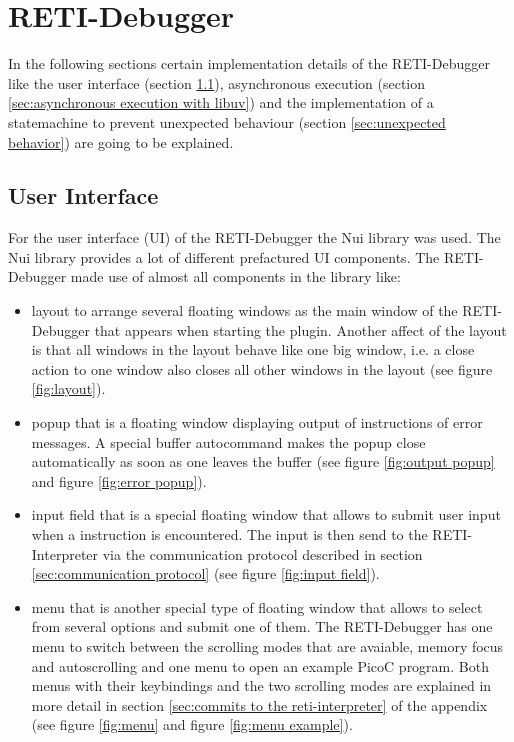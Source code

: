 \documentclass{report}
\begin{document}
\chapter{RETI-Debugger}
\label{ch:reti-debugger}

In the following sections certain implementation details of the RETI-Debugger like the user interface (section \ref{sec:user interface with nui}), asynchronous execution (section \ref{sec:asynchronous execution with libuv}) and the implementation of a statemachine to prevent unexpected behaviour (section \ref{sec:unexpected behavior}) are going to be explained.



\section{User Interface}
\label{sec:user interface with nui}

For the user interface (\alert{UI}) of the RETI-Debugger the \alert{Nui library}\cite{tanjimMunifTanjimNuiNvim2024} was used. The Nui library provides a lot of different prefactured UI components. The RETI-Debugger made use of almost all components in the library like:
\begin{itemize}
  \item \alert{layout} to arrange several floating windows as the main window of the RETI-Debugger that appears when starting the plugin. Another affect of the layout is that all windows in the layout behave like one big window, i.e. a close action to one window also closes all other windows in the layout (see figure \ref{fig:layout}).
  \item \alert{popup} that is a floating window displaying output of  instructions of error messages. A special buffer autocommand makes the popup close automatically as soon as one leaves the buffer (see figure \ref{fig:output popup} and figure \ref{fig:error popup}).
  \item \alert{input field} that is a special floating window that allows to submit user input when a  instruction is encountered. The input is then send to the RETI-Interpreter via the communication protocol described in section \ref{sec:communication protocol} (see figure \ref{fig:input field}).
  \item \alert{menu} that is another special type of floating window that allows to select from several options and submit one of them. The RETI-Debugger has one menu to switch between the \alert{scrolling modes} that are avaiable, \alert{memory focus} and \alert{autoscrolling} and one menu to open an example PicoC program. Both menus with their keybindings and the two scrolling modes are explained in more detail in section \ref{sec:commits to the reti-interpreter} of the appendix (see figure \ref{fig:menu} and figure \ref{fig:menu example}).
\end{itemize}
\end{document}
